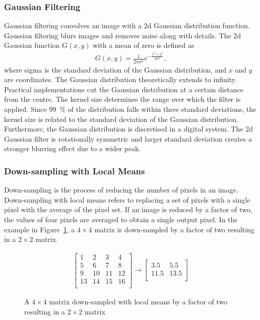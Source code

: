 \subsubsection{Gaussian Filtering} \label{sec:t_gauss}
Gaussian filtering convolves an image with a \gls{2d} Gaussian distribution function. Gaussian filtering blurs images and removes noise along with details. The \gls{2d} Gaussian function \gls{G}$(x,y)$ with a mean of zero is defined as
\begin{align}
    G(x,y) = \frac{1}{2\pi \sigma^{2}}e^{-\frac{x^2+y^2}{2\sigma^2}}, \label{eq:gauss_2d}
\end{align}
where \gls{sigma} is the standard deviation of the Gaussian distribution, and $x$ and $y$ are coordinates. The Gaussian distribution theoretically extends to infinity. Practical implementations cut the Gaussian distribution at a certain distance from the centre. The kernel size determines the range over which the filter is applied. Since \SI{99}{\percent} of the distribution falls within three standard deviations, the kernel size is related to the standard deviation of the Gaussian distribution. Furthermore, the Gaussian distribution is discretised in a digital system. The \gls{2d} Gaussian filter is rotationally symmetric and larger standard deviation creates a stronger blurring effect due to a wider peak.

\subsubsection{Down-sampling with Local Means} \label{sec:t_downsample}
Down-sampling is the process of reducing the number of pixels in an image. Down-sampling with local means refers to replacing a set of pixels with a single pixel with the average of the pixel set. If an image is reduced by a factor of two, the values of four pixels are averaged to obtain a single output pixel. In the example in Figure~\ref{fig:downsample_example}, a $4\times4$ matrix is down-sampled by a factor of two resulting in a $2\times2$ matrix.
\begin{figure}[htb]
    \begin{align*}
        \begin{bmatrix}
            1  & 2  & 3  & 4\\
            5  & 6  & 7  & 8\\
            9  & 10 & 11 & 12\\
            13 & 14 & 15 & 16\\
        \end{bmatrix} 
        \rightarrow 
        \begin{bmatrix}
            3.5  & 5.5\\
            11.5 & 13.5\\ 
        \end{bmatrix}
    \end{align*}
    \caption{A $4\times4$ matrix down-sampled with local means by a factor of two resulting in a $2\times2$ matrix}
    \label{fig:downsample_example}
\end{figure}
